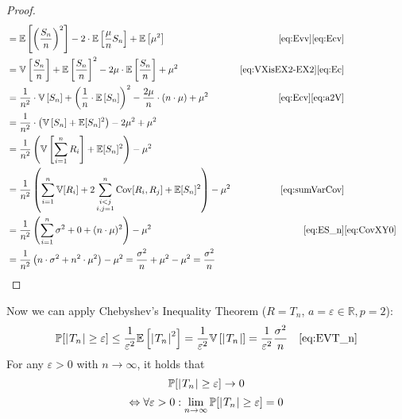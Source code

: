 \begin{proof}
\begin{align}
              &= \mathbb E\left[\left(\frac{S_n}{n}\right)^2\right] - 2\cdot\mathbb E\left[\frac{\mu}{n} S_n\right] + \mathbb E\left[\mu^2\right] & \eqref{eq:Evv}\eqref{eq:Ecv} \notag\\
              &= \mathbb V\left[\frac{S_n}{n}\right] + \mathbb E\left[\frac{S_n}{n}\right]^2 - 2\mu \cdot \mathbb E\left[\frac{S_n}{n}\right] + \mu^2 & \eqref{eq:VXisEX2-EX2}\eqref{eq:Ec} \notag \\
              &= \frac1{n^2} \cdot \mathbb V\left[S_n\right] + \left(\frac1{n} \cdot \mathbb E\left[S_n\right]\right)^2 - \frac{2\mu}{n} \cdot (n \cdot \mu) + \mu^2 & \eqref{eq:Ecv}\eqref{eq:a2V} \notag \\
              &= \frac1{n^2} \cdot \left(\mathbb V\left[S_n\right] + \mathbb E[S_n]^2\right) - 2\mu^2 + \mu^2 \notag \\
              &= \frac{1}{n^2} \left(\mathbb V\left[\sum_{i=1}^n R_i\right] + \mathbb E[S_n]^2\right) - \mu^2 \notag\\
              &= \frac{1}{n^2} \left(\sum_{i=1}^n \mathbb V[R_i] + 2\sum_{\substack{i<j \\ i,j=1}}^n \operatorname{Cov}[R_i,R_j] + \mathbb E[S_n]^2\right) - \mu^2 & \eqref{eq:sumVarCov} \notag\\
              &= \frac{1}{n^2} \left(\sum_{i=1}^n \sigma^2 + 0 + (n \cdot \mu)^2\right) - \mu^2 & \eqref{eq:ES_n} & \eqref{eq:CovXY0} \notag\\
              &= \frac{1}{n^2} \left(n \cdot \sigma^2 + n^2 \cdot \mu^2\right) - \mu^2 = \frac{\sigma^2}{n} + \mu^2 - \mu^2 = \frac{\sigma^2}{n}
  \end{align}
\end{proof}
%
%
%
Now we can apply Chebyshev's Inequality Theorem ($R = T_n$, $a = \varepsilon \in \mathbb R, p = 2$):
\begin{align}
  \mathbb P[\left|\hspace{0.6999pt}T_n\hspace{0.6999pt}\right| \geq \varepsilon]
    &\leq \frac{1}{\varepsilon^2} \mathbb E\left[\left|\hspace{0.6999pt}T_n\hspace{0.6999pt}\right|^2\right]
    = \frac{1}{\varepsilon^2} \mathbb V\left[\left|\hspace{0.6999pt}T_n\hspace{0.6999pt}\right|\right]
    = \frac{1}{\varepsilon^2} \frac{\sigma^2}{n}
    & \eqref{eq:EVT_n} \label{eq:cheby-applied}
\end{align}
For any $\varepsilon > 0$ with $n \to \infty$, it holds that
\[ \mathbb P[\left|\hspace{0.6999pt}T_n\hspace{0.6999pt}\right| \geq \varepsilon] \to 0 \]
\[
    \Leftrightarrow \forall \varepsilon > 0:
    \lim_{n\to\infty} \mathbb P[\left|\hspace{0.6999pt}T_n\hspace{0.6999pt}\right| \geq \varepsilon] = 0
\]

